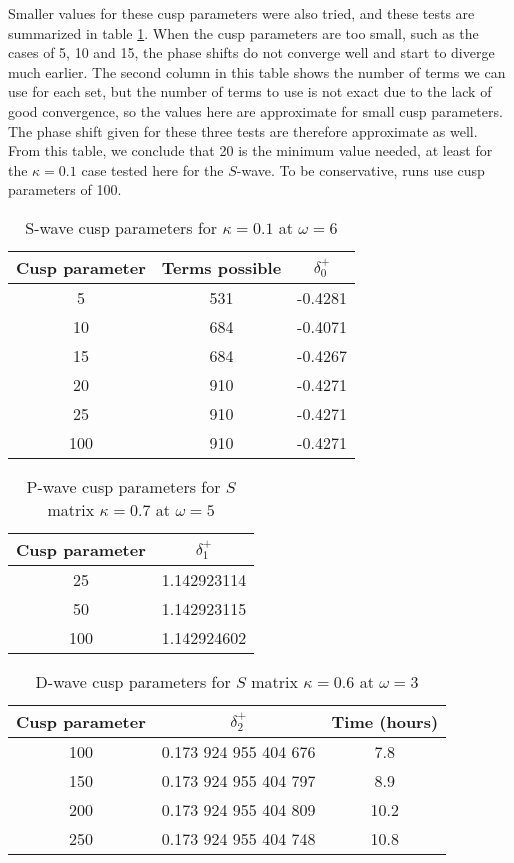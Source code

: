 \documentclass[Dissertation.tex]{subfiles}
\begin{document}
Smaller values for these cusp parameters were also tried, and these tests are 
summarized in table \ref{tab:SWaveCuspParameters}. When the cusp parameters 
are too small, such as the cases of 5, 10 and 15, the phase shifts do not 
converge well and start to diverge much earlier. The second column in this 
table shows the number of terms we can use for each set, but the number of 
terms to use is not exact due to the lack of good convergence, so the values 
here are approximate for small cusp parameters. The phase shift given for 
these three tests are therefore approximate as well. From this table, we 
conclude that 20 is the minimum value needed, at least for the $\kappa = 0.1$ 
case tested here for the $S$-wave. To be conservative, runs use cusp 
parameters of 100. 



\begin{table}[H]
\centering
\begin{tabular}{c c c}
\toprule
Cusp parameter & Terms possible & $\delta_0^+$ \\
\midrule
 5 & 531 & -0.4281 \\
10 & 684 & -0.4071 \\
15 & 684 & -0.4267 \\
20 & 910 & -0.4271 \\
25 & 910 & -0.4271 \\
100 & 910 & -0.4271 \\
\bottomrule
\end{tabular}
\caption{S-wave cusp parameters for $\kappa = 0.1$ at $\omega = 6$}
\label{tab:SWaveCuspParameters}
\end{table}

\begin{table}[H]
\centering
\begin{tabular}{c c}
\toprule
Cusp parameter & $\delta_1^+$ \\
\midrule
 25 & 1.142923114 \\
 50 & 1.142923115 \\
100 & 1.142924602 \\
\bottomrule
\end{tabular}
\caption{P-wave cusp parameters for $S$ matrix $\kappa = 0.7$ at $\omega = 5$}
\label{tab:PWaveCuspParameters}
\end{table}


\begin{table}[H]
\centering
\begin{tabular}{c c c}
\toprule
Cusp parameter & $\delta_2^+$ & Time (hours) \\
\midrule
100 & 0.173 924 955 404 676 & 7.8 \\
150 & 0.173 924 955 404 797 & 8.9 \\
200 & 0.173 924 955 404 809 & 10.2 \\
250 & 0.173 924 955 404 748 & 10.8 \\
\bottomrule
\end{tabular}
\caption{D-wave cusp parameters for $S$ matrix $\kappa = 0.6$ at $\omega = 3$}
\label{tab:DWaveCuspParameters}
\end{table}
\end{document}
